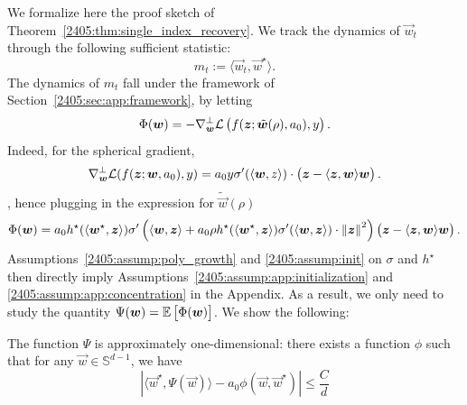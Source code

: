We formalize here the proof sketch of Theorem~\ref{2405:thm:single_index_recovery}.  We track the dynamics of $\vec{w}_t$ through the following sufficient statistic:
\begin{equation}
  m_t := \langle \vec{w}_t, \vec{w}^\star \rangle.
\end{equation}
The dynamics of $m_t$ fall under the framework of Section~\ref{2405:sec:app:framework}, by letting
\[ \Phi({\boldsymbol{w}}) = -\nabla_{{\boldsymbol{w}}}^\bot\mathcal{L}\left(f({\boldsymbol{z}}; \tilde{{\boldsymbol{w}}}(\rho), a_0),  y \right). \]
Indeed, for the spherical gradient,
\begin{align*}
  \nabla_{{\boldsymbol{w}}}^\bot \mathcal{L}(f({\boldsymbol{z}}; {\boldsymbol{w}}, a_0), y) = a_0 y \sigma'(\langle {\boldsymbol{w}}, z \rangle) \cdot \left({\boldsymbol{z}} - \langle {\boldsymbol{z}}, {\boldsymbol{w}} \rangle {\boldsymbol{w}} \right).
\end{align*},
hence plugging in the expression for $\tilde{\vec{w}}(\rho)$
\begin{equation}\label{2405:eq:app:phi_expression}
    \Phi({\boldsymbol{w}}) = a_0 h^\star(\langle {\boldsymbol{w}}^\star, {\boldsymbol{z}} \rangle) \sigma'\left(\langle {\boldsymbol{w}}, {\boldsymbol{z}} \rangle + a_0\rho h^\star(\langle {\boldsymbol{w}}^\star, {\boldsymbol{z}} \rangle) \sigma'(\langle {\boldsymbol{w}}, {\boldsymbol{z}} \rangle) \cdot \left\lVert {\boldsymbol{z}}\right\rVert^2\right) \left({\boldsymbol{z}} - \langle {\boldsymbol{z}}, {\boldsymbol{w}} \rangle {\boldsymbol{w}} \right).
\end{equation} 
Assumptions~\ref{2405:assump:poly_growth} and \ref{2405:assump:init} on $\sigma$ and $h^\star$ then directly imply Assumptions~\ref{2405:assump:app:initialization} and \ref{2405:assump:app:concentration} in the Appendix. As a result, we only need to study the quantity $\Psi({\boldsymbol{w}}) = \mathbb{E}\left[\Phi({\boldsymbol{w}})\right]$.
We show the following:
\begin{lemma}\label{2405:lem:app:psi_low_rank}
    The function $\Psi$ is approximately one-dimensional: there exists a function $\phi$ such that for any $\vec{w} \in \mathbb{S}^{d-1}$, we have
    \[ |\langle \vec{w}^\star, \Psi(\vec{w}) \rangle- a_0 \phi(\vec{w}, \vec{w}^\star)| \leq \frac{C}d \]
\end{lemma}

